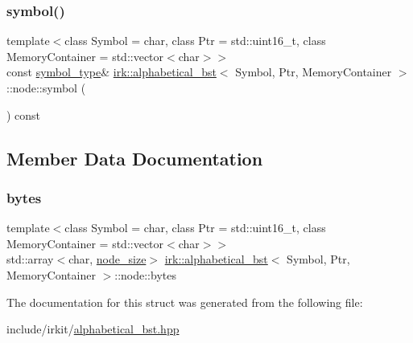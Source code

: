 \subsubsection{\texorpdfstring{symbol()}{symbol()}}
{\footnotesize\ttfamily template$<$class Symbol = char, class Ptr = std\+::uint16\+\_\+t, class Memory\+Container = std\+::vector$<$char$>$$>$ \\
const \mbox{\hyperlink{classirk_1_1alphabetical__bst_a296ccb8fa9fa9dce3b3c3beab0a5ca28}{symbol\+\_\+type}}\& \mbox{\hyperlink{classirk_1_1alphabetical__bst}{irk\+::alphabetical\+\_\+bst}}$<$ Symbol, Ptr, Memory\+Container $>$\+::node\+::symbol (\begin{DoxyParamCaption}{ }\end{DoxyParamCaption}) const\hspace{0.3cm}{\ttfamily [inline]}}



\subsection{Member Data Documentation}
\mbox{\label{structirk_1_1alphabetical__bst_1_1node_a0ecc1ed0ebca1446a4dc5b32a0e826a7}} 
\subsubsection{\texorpdfstring{bytes}{bytes}}
{\footnotesize\ttfamily template$<$class Symbol = char, class Ptr = std\+::uint16\+\_\+t, class Memory\+Container = std\+::vector$<$char$>$$>$ \\
std\+::array$<$char, \mbox{\hyperlink{classirk_1_1alphabetical__bst_a6f7d3f7002730eb7840e449d4d371235}{node\+\_\+size}}$>$ \mbox{\hyperlink{classirk_1_1alphabetical__bst}{irk\+::alphabetical\+\_\+bst}}$<$ Symbol, Ptr, Memory\+Container $>$\+::node\+::bytes}



The documentation for this struct was generated from the following file\+:\begin{DoxyCompactItemize}
\item 
include/irkit/\mbox{\hyperlink{alphabetical__bst_8hpp}{alphabetical\+\_\+bst.\+hpp}}\end{DoxyCompactItemize}
